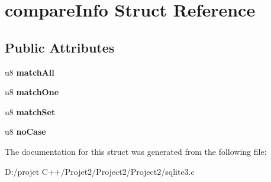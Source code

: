 \hypertarget{structcompare_info}{}\section{compare\+Info Struct Reference}
\label{structcompare_info}
\subsection*{Public Attributes}
\begin{DoxyCompactItemize}
\item 
\mbox{\label{structcompare_info_a1161e850029ef556e6daee856d32b2e2}} 
u8 {\bfseries match\+All}
\item 
\mbox{\label{structcompare_info_ab9aabbf6d3df26bad786b532330a2fd7}} 
u8 {\bfseries match\+One}
\item 
\mbox{\label{structcompare_info_a5d2ff58a72c9eb7d22f18915c1751655}} 
u8 {\bfseries match\+Set}
\item 
\mbox{\label{structcompare_info_a6de76861b066547321f7a255cb7042ab}} 
u8 {\bfseries no\+Case}
\end{DoxyCompactItemize}


The documentation for this struct was generated from the following file\+:\begin{DoxyCompactItemize}
\item 
D\+:/projet C++/\+Projet2/\+Project2/\+Project2/sqlite3.\+c\end{DoxyCompactItemize}
